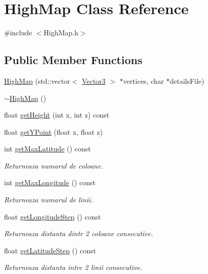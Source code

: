 \hypertarget{class_high_map}{\section{High\-Map Class Reference}
\label{class_high_map}
}


{\ttfamily \#include $<$High\-Map.\-h$>$}

\subsection*{Public Member Functions}
\begin{DoxyCompactItemize}
\item 
\hyperlink{class_high_map_ae54cafe69f16922eb8cfed91a802f220}{High\-Map} (std\-::vector$<$ \hyperlink{struct_vector3}{Vector3} $>$ $\ast$vertices, char $\ast$details\-File)
\item 
\hyperlink{class_high_map_ad1f53955c59d06ce16669580262281d3}{$\sim$\-High\-Map} ()
\item 
float \hyperlink{class_high_map_a9822e27bd6a75ff6af8661ba6c08bac5}{get\-Height} (int x, int z) const 
\item 
float \hyperlink{class_high_map_a329cf5cbdece4a8e13f153d306fcb032}{get\-Y\-Point} (float x, float z)
\item 
int \hyperlink{class_high_map_adc3b5a647195ae6c98f02585ec7951ae}{get\-Max\-Latitude} () const 
\begin{DoxyCompactList}\small\item\em Returneaza numarul de coloane. \end{DoxyCompactList}\item 
int \hyperlink{class_high_map_a3b3ebb7d9ad385f0df948639e3018a97}{get\-Max\-Longitude} () const 
\begin{DoxyCompactList}\small\item\em Returneaza numarul de linii. \end{DoxyCompactList}\item 
float \hyperlink{class_high_map_a657e8cf3bc92060a1baa2e7d5c4049d8}{get\-Longitude\-Step} () const 
\begin{DoxyCompactList}\small\item\em Returneaza distanta dintr 2 coloane consecutive. \end{DoxyCompactList}\item 
float \hyperlink{class_high_map_a8b5534cb6e91dc35e23e8a0b3335521d}{get\-Latitude\-Step} () const 
\begin{DoxyCompactList}\small\item\em Returneaza distanta intre 2 linii consecutive. \end{DoxyCompactList}\item 

\end{DoxyCompactItemize}
